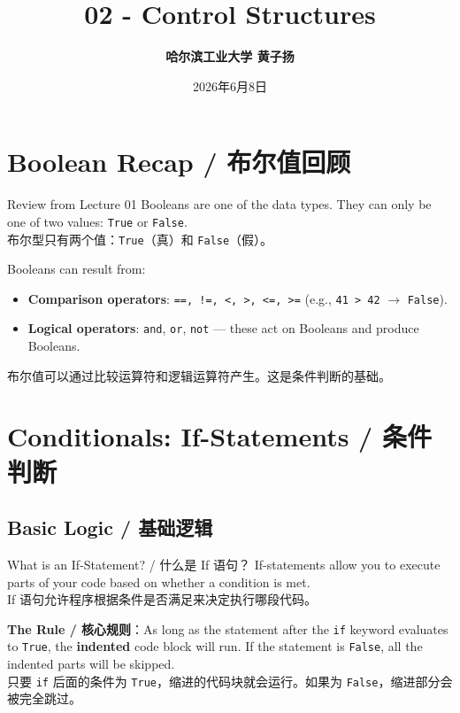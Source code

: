 \documentclass[11pt,a4paper]{article}
\title{\Huge \bfseries 02 - Control Structures}
\author{\Large \textbf{哈尔滨工业大学 \quad 黄子扬}}
\date{2026年6月8日}
\begin{document}
\maketitle
\tableofcontents
\newpage

\section{Boolean Recap / 布尔值回顾}

\begin{concept}{Review from Lecture 01}
    Booleans are one of the data types. They can only be one of two values: \texttt{True} or \texttt{False}. \\
    布尔型只有两个值：\texttt{True}（真）和 \texttt{False}（假）。

    Booleans can result from:
    \begin{itemize}[itemsep=0.3em]
        \item \textbf{Comparison operators}: \texttt{==, !=, <, >, <=, >=} (e.g., \texttt{41 > 42} $\rightarrow$ \texttt{False}).
        \item \textbf{Logical operators}: \texttt{and}, \texttt{or}, \texttt{not} — these act on Booleans and produce Booleans.
    \end{itemize}
    布尔值可以通过比较运算符和逻辑运算符产生。这是条件判断的基础。
\end{concept}

\section{Conditionals: If-Statements / 条件判断}

\subsection{Basic Logic / 基础逻辑}

\begin{concept}{What is an If-Statement? / 什么是 If 语句？}
    If-statements allow you to execute parts of your code based on whether a condition is met. \\
    If 语句允许程序根据条件是否满足来决定执行哪段代码。

    \textbf{The Rule / 核心规则}：As long as the statement after the \texttt{if} keyword evaluates to \texttt{True}, the \textbf{indented} code block will run. If the statement is \texttt{False}, all the indented parts will be skipped. \\
    只要 \texttt{if} 后面的条件为 \texttt{True}，缩进的代码块就会运行。如果为 \texttt{False}，缩进部分会被完全跳过。
\end{concept}
\end{document}
